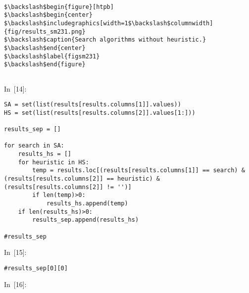\documentclass{article}
\begin{document}
\begin{verbatim}

$\backslash$begin{figure}[htpb]
$\backslash$begin{center}
$\backslash$includegraphics[width=1$\backslash$columnwidth]{fig/results_sm231.png}
$\backslash$caption{Search algorithms without heuristic.}
$\backslash$end{center}
$\backslash$label{figsm231}
$\backslash$end{figure}
    
\end{verbatim}









In~[14]:

    
\begin{verbatim}SA = set(list(results[results.columns[1]].values))
HS = set(list(results[results.columns[2]].values[1:]))

results_sep = []

for search in SA:
    results_hs = []
    for heuristic in HS:
        temp = results.loc[(results[results.columns[1]] == search) & (results[results.columns[2]] == heuristic) & (results[results.columns[2]] != '')]
        if len(temp)>0:
            results_hs.append(temp)
    if len(results_hs)>0:
        results_sep.append(results_hs)
            
#results_sep
\end{verbatim}








In~[15]:

    
\begin{verbatim}#results_sep[0][0]
\end{verbatim}








In~[16]:
\end{document}
